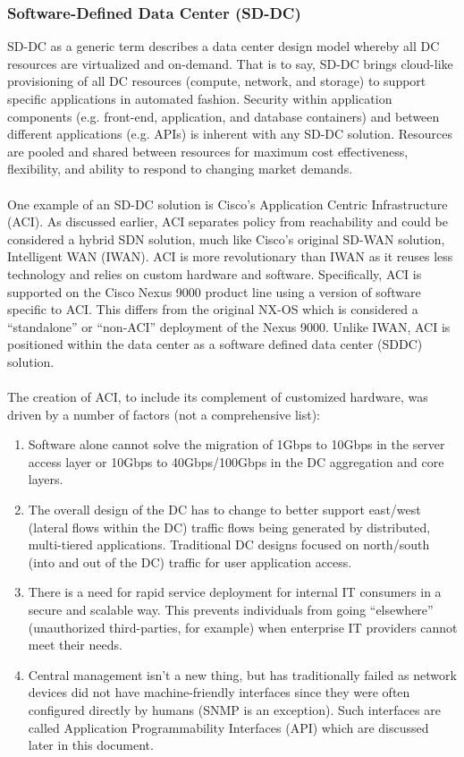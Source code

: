 \subsubsection{Software-Defined Data Center (SD-DC)}
SD-DC as a generic term describes a data center design model whereby all DC
resources are virtualized and on-demand. That is to say, SD-DC brings
cloud-like provisioning of all DC resources (compute, network, and storage) to
support specific applications in automated fashion. Security within
application components (e.g. front-end, application, and database containers)
and between different applications (e.g. APIs) is inherent with any SD-DC
solution. Resources are pooled and shared between resources for maximum cost
effectiveness, flexibility, and ability to respond to changing market demands.
\\ \\
One example of an SD-DC solution is Cisco's Application Centric Infrastructure
(ACI). As discussed earlier, ACI separates policy from reachability and could
be considered a hybrid SDN solution, much like Cisco's original SD-WAN
solution, Intelligent WAN (IWAN). ACI is more revolutionary than IWAN as it
reuses less technology and relies on custom hardware and software.
Specifically, ACI is supported on the Cisco Nexus 9000 product line using a
version of software specific to ACI. This differs from the original NX-OS
which is considered a ``standalone'' or ``non-ACI'' deployment of the Nexus 9000.
Unlike IWAN, ACI is positioned within the data center as a software defined
data center (SDDC) solution.
\\ \\
The creation of ACI, to include its complement of customized hardware, was
driven by a number of factors (not a comprehensive list):

\begin{enumerate}
  \item Software alone cannot solve the migration of 1Gbps to 10Gbps in the
  server access layer or 10Gbps to 40Gbps/100Gbps in the DC aggregation and
  core layers.
  \item The overall design of the DC has to change to better support east/west
  (lateral flows within the DC) traffic flows being generated by distributed,
  multi-tiered applications. Traditional DC designs focused on north/south
  (into and out of the DC) traffic for user application access.
  \item There is a need for rapid service deployment for internal IT consumers
  in a secure and scalable way. This prevents individuals from going
  ``elsewhere'' (unauthorized third-parties, for example) when enterprise IT
  providers cannot meet their needs.
  \item Central management isn’t a new thing, but has traditionally failed as
  network devices did not have machine-friendly interfaces since they were
  often configured directly by humans (SNMP is an exception). Such interfaces
  are called Application Programmability Interfaces (API) which are discussed
  later in this document.
\end{enumerate}


